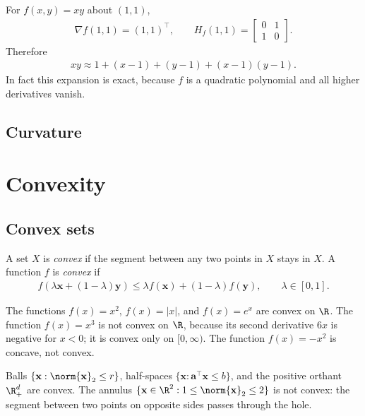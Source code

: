 \documentclass[a4paper, 12pt]{book}
\begin{document}
\begin{example}
    For $f(x,y)=xy$ about $(1,1)$,
    \begin{align}
        \nabla f(1,1) = (1,1)^\top,
        \qquad
        H_f(1,1) = \begin{bmatrix}0&1\\1&0\end{bmatrix}.
    \end{align}
    Therefore
    \begin{align}
        xy \approx 1 + (x-1) + (y-1) + (x-1)(y-1).
    \end{align}
    In fact this expansion is exact, because $f$ is a quadratic polynomial and all
    higher derivatives vanish.
\end{example}

\subsection{Curvature}

\section{Convexity}

\subsection{Convex sets}
\begin{definition}
    A set $X$ is \emph{convex} if the segment between any two points in $X$ stays in $X$. A function $f$ is \emph{convex} if
\begin{align}
    f(\lambda \mathbf{x} + (1-\lambda)\mathbf{y})
    \leq \lambda f(\mathbf{x}) + (1-\lambda) f(\mathbf{y}),
    \qquad \lambda \in [0,1].
\end{align}
\end{definition}

\begin{example}
    The functions $f(x)=x^2$, $f(x)=|x|$, and $f(x)=e^x$ are convex on $\R$. The
    function $f(x)=x^3$ is not convex on $\R$, because its second derivative $6x$ is
    negative for $x<0$; it is convex only on $[0,\infty)$. The function $f(x)=-x^2$
    is concave, not convex.
\end{example}

\begin{example}
    Balls $\{\mathbf{x}:\norm{\mathbf{x}}_2\leq r\}$, half-spaces
    $\{\mathbf{x}:\mathbf{a}^\top\mathbf{x}\leq b\}$, and the positive orthant
    $\R^d_+$ are convex. The annulus
    $\{\mathbf{x}\in\R^2:1\leq\norm{\mathbf{x}}_2\leq2\}$ is not convex: the segment
    between two points on opposite sides passes through the hole.
\end{example}
\end{document}
